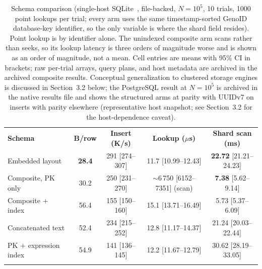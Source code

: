 \documentclass{svproc}
\begin{document}
\begin{table}[!ht]
\caption{Schema comparison (single-host SQLite~\cite{22}, file-backed, $N=10^5$, 10 trials, 1000
point lookups per trial; every arm uses the same timestamp-sorted GenoID
database-key identifier, so the only variable is where the shard field
resides). Point lookup is by identifier alone. The unindexed composite arm
scans rather than seeks, so its lookup latency is three orders of
magnitude worse and is shown as an order of magnitude, not a mean.
Cell entries are means with 95\% CI in brackets; raw per-trial arrays, query plans, and host metadata are
archived in the archived composite results.
Conceptual generalization to clustered storage engines is discussed in
Section~3.2 below; the PostgreSQL result at $N=10^5$ is archived in the native results file and shows the
structured arms at parity with UUIDv7 on inserts with parity elsewhere
(representative host snapshot; see Section~3.2 for the host-dependence caveat).}
\label{tab:composite}
\centering\footnotesize
\begin{tabular*}{\columnwidth}{@{\extracolsep{\fill}}lcccc}
\hline\noalign{\smallskip}
\textbf{Schema} & \textbf{B/row} & \textbf{Insert (K/s)} & \textbf{Lookup ($\mu$s)} & \textbf{Shard scan (ms)} \\
\noalign{\smallskip}\hline\noalign{\smallskip}
Embedded layout         & \textbf{28.4} & 291 [274--307] & 11.7 [10.99--12.43] & \textbf{22.72} [21.21--24.23] \\
Composite, PK only       & 30.2 & 250 [231--270] & $\sim$6\,750 [6152--7351] (scan) & \textbf{7.38} [5.62--9.14] \\
Composite $+$ index      & 56.4 & 155 [150--160] & 15.1 [13.71--16.49] & 5.73 [5.37--6.09] \\
Concatenated text        & 52.4 & 234 [215--252] & 12.8 [11.17--14.37] & 21.24 [20.03--22.44] \\
PK $+$ expression index  & 54.9 & 141 [136--145] & 12.2 [11.67--12.79] & 30.62 [28.19--33.05] \\
\noalign{\smallskip}\hline
\end{tabular*}
\end{table}
\end{document}
